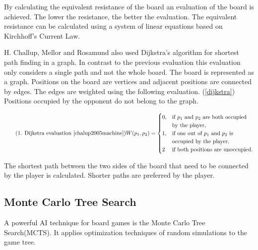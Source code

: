 \documentclass{ba-kecs}
\begin{document}
By calculating the equivalent resistance of the board an evaluation of the board is achieved. The lower the resistance, the better the evaluation. The equivalent resistance can be calculated using a system of linear equations based on Kirchhoff’s Current Law. \cite{anshelevich2002hierarchical}

H. Challup, Mellor and Rosamund \cite{chalup2005machine} also used Dijkstra’s algorithm for shortest path finding in a graph. In contrast to the previous evaluation this evaluation only considers a single path and not the whole board.  The board is represented as a graph. Positions on the board are vertices and adjacent positions are connected by edges. The edges are weighted using the following evaluation. (\ref{dijkstra}) Positions occupied by the opponent do not belong to the graph.
\begin{center}
\begin{equation}
\label{dijkstra}
\tag{1. Dijkstra evaluation \cite{chalup2005machine}}
W(p_1,p_2)=\begin{cases}
0, & \text{if $p_1$  and $p_2$ are both occupied}\\
   & \text{by the player},\\
1, & \text{if one out of $p_1$ and $p_2$ is}\\
   & \text{occupied by the player},\\
2 & \text{if both positions are unoccupied}.
\end{cases}
\end{equation}
\end{center}
The shortest path between the two sides of the board that need to be connected by the player is calculated. Shorter paths are preferred by the player. 

\subsection{Monte Carlo Tree Search}
A powerful AI technique for board games is the Monte Carlo Tree Search(MCTS). It applies optimization techniques of random simulations to the game tree. 
\end{document}
